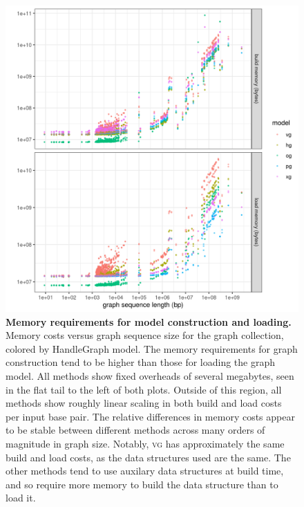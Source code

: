 \documentclass{article}
\begin{document}
\begin{figure}
  \centering
  \includegraphics[width=1.0\textwidth]{figures/build_and_load_memory.png}
  \caption{
    \label{fig:prof1}
    \textbf{Memory requirements for model construction and loading.}
    Memory costs versus graph sequence size for the graph collection, colored by HandleGraph model.
    The memory requirements for graph construction tend to be higher than those for loading the graph model.
    All methods show fixed overheads of several megabytes, seen in the flat tail to the left of both plots.
    Outside of this region, all methods show roughly linear scaling in both build and load costs per input base pair.
    The relative differences in memory costs appear to be stable between different methods across many orders of magnitude in graph size.
    Notably, \textsc{vg} has approximately the same build and load costs, as the data structures used are the same.
    The other methods tend to use auxilary data structures at build time, and so require more memory to build the data structure than to load it.
    }
\end{figure}
\end{document}
